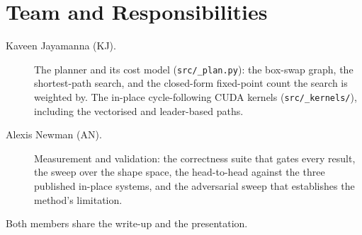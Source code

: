 %
\section*{Team and Responsibilities}

\begin{description}
\item[Kaveen Jayamanna (KJ).] The planner and its cost model
  (\texttt{src/\_plan.py}): the box-swap graph, the shortest-path search, and
  the closed-form fixed-point count the search is weighted by. The in-place
  cycle-following CUDA kernels (\texttt{src/\_kernels/}), including the
  vectorised and leader-based paths.

\item[Alexis Newman (AN).] Measurement and validation: the correctness suite
  that gates every result, the sweep over the shape space, the head-to-head
  against the three published in-place systems, and the adversarial sweep that
  establishes the method's limitation.
\end{description}

Both members share the write-up and the presentation.
